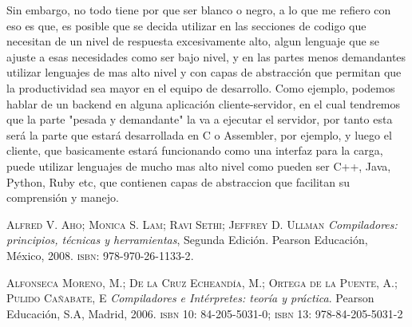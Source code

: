 \documentclass{article}
\begin{document}
Sin embargo, no todo tiene por que ser blanco o negro, a lo que me refiero con eso es que, es posible que se decida utilizar en las secciones de codigo que necesitan de un nivel de respuesta excesivamente alto, algun lenguaje que se ajuste a esas necesidades como ser bajo nivel, y en las partes menos demandantes utilizar lenguajes de mas alto nivel y con capas de abstracci\'on que permitan que la productividad sea mayor en el equipo de desarrollo. Como ejemplo, podemos hablar de un backend en alguna aplicaci\'on cliente-servidor, en el cual tendremos que la parte "pesada y demandante" la va a ejecutar el servidor, por tanto esta ser\'a la parte que estar\'a desarrollada en C o Assembler, por ejemplo, y luego el cliente, que basicamente estar\'a funcionando como una interfaz para la carga, puede utilizar lenguajes de mucho mas alto nivel como pueden ser C++, Java, Python, Ruby etc, que contienen capas de abstraccion que facilitan su comprensi\'on y manejo. 


\newpage
\begin{thebibliography}{9}
	\textsc{Alfred V. Aho; Monica S. Lam; Ravi Sethi; Jeffrey D. Ullman}
	\textit{Compiladores: principios, t\'ecnicas y herramientas}, Segunda Edici\'on. 
	Pearson Educaci\'on, M\'exico, 2008. \textsc{isbn: 978-970-26-1133-2}.


	\textsc{Alfonseca Moreno, M.; De la Cruz Echeand\'ia, M.; Ortega de la Puente, A.; Pulido Ca\~{n}abate, E}
	\textit{Compiladores e Int\'erpretes: teor\'ia y pr\'actica}. 
	Pearson Educaci\'on, S.A, Madrid, 2006. \textsc{isbn 10: 84-205-5031-0; isbn 13: 978-84-205-5031-2}
\end{thebibliography}
\end{document}
